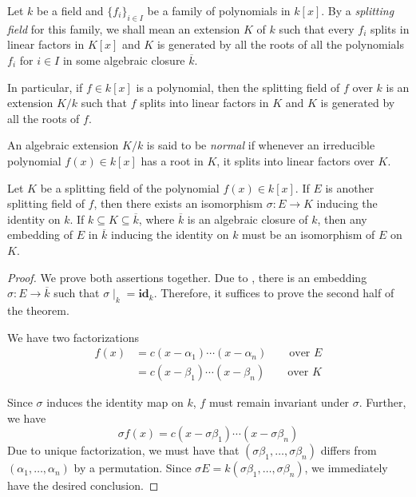 \begin{definition}
    Let $k$ be a field and $\{f_i\}_{i\in I}$ be a family of polynomials in $k[x]$. By a \textit{splitting field} for this family, we shall mean an extension $K$ of $k$ such that every $f_i$ splits in linear factors in $K[x]$ and $K$ is generated by all the roots of all the polynomials $f_i$ for $i\in I$ in some algebraic closure $\overline{k}$.
\end{definition}

In particular, if $f\in k[x]$ is a polynomial, then the splitting field of $f$ over $k$ is an extension $K/k$ such that $f$ splits into linear factors in $K$ and $K$ is generated by all the roots of $f$.

\begin{definition}
    An algebraic extension $K/k$ is said to be \textit{normal} if whenever an irreducible polynomial $f(x)\in k[x]$ has a root in $K$, it splits into linear factors over $K$.
\end{definition}

\begin{theorem}
    Let $K$ be a splitting field of the polynomial $f(x)\in k[x]$. If $E$ is another splitting field of $f$, then there exists an isomorphism $\sigma: E\to K$ inducing the identity on $k$. If $k\subseteq K\subseteq\overline{k}$, where $\overline{k}$ is an algebraic closure of $k$, then any embedding of $E$ in $\overline{k}$ inducing the identity on $k$ must be an isomorphism of $E$ on $K$.
\end{theorem}
\begin{proof}
    We prove both assertions together. Due to , there is an embedding $\sigma: E\to\overline{k}$ such that $\sigma\mid_k = \mathbf{id}_k$. Therefore, it suffices to prove the second half of the theorem.

    We have two factorizations 
    \begin{align*}
        f(x) &= c(x - \alpha_1)\cdots(x - \alpha_n)\qquad\text{over $E$}\\
        &= c(x - \beta_1)\cdots(x - \beta_n)\qquad\text{over $K$}
    \end{align*}

    Since $\sigma$ induces the identity map on $k$, $f$ must remain invariant under $\sigma$. Further, we have 
    \begin{equation*}
        \sigma f(x) = c(x - \sigma\beta_1)\cdots(x - \sigma\beta_n)
    \end{equation*}
    Due to unique factorization, we must have that $(\sigma\beta_1,\ldots,\sigma\beta_n)$ differs from $(\alpha_1,\ldots,\alpha_n)$ by a permutation. Since $\sigma E = k(\sigma\beta_1,\ldots,\sigma\beta_n)$, we immediately have the desired conclusion.
\end{proof}


